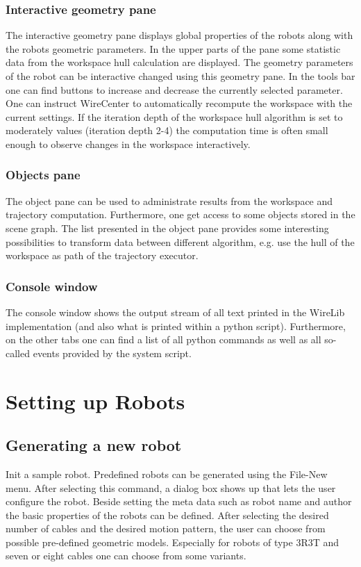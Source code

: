 \documentclass[11pt,a4paper,onepage,openany]{book}
\begin{document}
\subsection{Interactive geometry pane}
The interactive geometry pane displays global properties of the robots along
with the robots geometric parameters. In the upper parts of the pane some
statistic data from the workspace hull calculation are displayed. The geometry
parameters of the robot can be interactive changed using this geometry pane. In
the tools bar one can find buttons to increase and decrease the currently
selected parameter. One can instruct WireCenter to automatically recompute the
workspace with the current settings. If the iteration depth of the workspace
hull algorithm is set to moderately values (iteration depth 2-4) the
computation time is often small enough to observe changes in the workspace
interactively.

\subsection{Objects pane}
The object pane can be used to administrate results from the workspace and
trajectory computation. Furthermore, one get access to some objects stored in
the scene graph. The list presented in the object pane provides some
interesting possibilities to transform data between different algorithm, e.g.
use the hull of the workspace as path of the trajectory executor.

\subsection{Console window}
The console window shows the output stream of all text printed in the WireLib
implementation (and also what is printed within a python script). Furthermore,
on the other tabs one can find a list of all python commands as well as all
so-called events provided by the system script.

\chapter{Setting up Robots}\label{sec:SetupRobot}%
\section{Generating a new robot}
Init a sample robot. Predefined robots can be generated using the File-New
menu. After selecting this command, a dialog box shows up that lets the user
configure the robot. Beside setting the meta data such as robot name and author
the basic properties of the robots can be defined. After selecting the desired
number of cables and the desired motion pattern, the user can choose from
possible pre-defined geometric models. Especially for robots of type 3R3T and
seven or eight cables one can choose from some variants.
\end{document}
